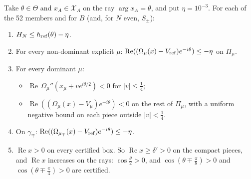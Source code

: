 \documentclass[11pt]{article}
\theoremstyle{remark}\newtheorem{remark}[theorem]{Remark}
\begin{document}
\begin{proposition}\label{prop:cert}
Take $\theta\in\Theta$ and $x_A\in\mathcal X_A$ on the ray $\arg x_A=\theta$, and put $\eta=10^{-3}$. For each of the 52 members and for $B$ (and, for $N$ even, $S_\pm$):
\begin{enumerate}
\item[(H)] $H_N\le h_{\rm ref}(\theta)-\eta$.
\item[(a)] For every non-dominant explicit $\mu$: $\operatorname{Re}((\Omega_\mu(x)-V_{\rm ref})e^{-i\theta})\le-\eta$ on $\Pi_\mu$.
\item[(b)] For every dominant $\mu$:
 \begin{itemize}
 \item $\operatorname{Re}\,\Omega_\mu''(x_\mu+ve^{i\theta/2})<0$ for $|v|\le\frac14$;
 \item $\operatorname{Re}((\Omega_\mu(x)-V_\mu)e^{-i\theta})<0$ on the rest of $\Pi_\mu$, with a uniform negative bound on each piece outside $|v|<\frac14$.
 \end{itemize}
\item[(c)] On $\gamma_\mp$: $\operatorname{Re}((\Omega_{\mu_\mp}(x)-V_{\rm ref})e^{-i\theta})\le-\eta$.
\item[(d)] $\operatorname{Re}x>0$ on every certified box. So $\operatorname{Re}x\ge\delta'>0$ on the compact pieces, and $\operatorname{Re}x$ increases on the rays: $\cos\frac\theta2>0$, and $\cos(\theta\mp\frac\pi8)>0$ and $\cos(\theta\mp\frac\pi4)>0$ are certified.
\end{enumerate}
\end{proposition}
\end{document}
